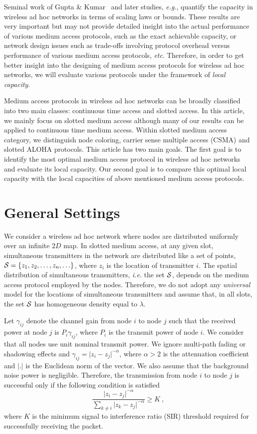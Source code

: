 \documentclass[12pt,english]{article}
\begin{document}
Seminal work of Gupta \& Kumar~\cite{Gupta:Kumar} and later studies, {\it e.g.}, \cite{scaling,scaling2} quantify the capacity in wireless ad hoc networks in terms of scaling laws or bounds. These results are very important but may not provide detailed insight into the actual performance of various medium access protocols, such as the exact achievable capacity, or network design issues such as trade-offs involving protocol overhead versus performance of various medium access protocols, {\it etc}. Therefore, in order to get better insight into the designing of medium access protocols for wireless ad hoc networks, we will evaluate various protocols under the framework of {\em local capacity}.

Medium access protocols in wireless ad hoc networks can be broadly classified into two main classes: continuous time access and slotted access. In this article, we mainly focus on slotted medium access although many of our results can be applied to continuous time medium access. Within slotted medium access category, we distinguish node coloring, carrier sense multiple access (CSMA) and slotted ALOHA protocols. This article has two main goals. The first goal is to identify the most optimal medium access protocol in wireless ad hoc networks and evaluate its local capacity. Our second goal is to compare this optimal local capacity with the local capacities of above mentioned medium access protocols.

\section{General Settings}
\label{sec:model}

We consider a wireless ad hoc network where nodes are distributed uniformly over an infinite $2D$ map. In slotted medium access, at any given slot, simultaneous transmitters in the network are distributed like a set of points, \mbox{${\cal S}=\{z_1,z_2,\ldots,z_n,\ldots\}$}, where $z_i$ is the location of transmitter $i$. The spatial distribution of simultaneous transmitters, {\it i.e.} the set ${\cal S}$, depends on the medium access protocol employed by the nodes. Therefore, we do not adopt any {\em universal} model for the locations of simultaneous transmitters and assume that, in all slots, the set ${\cal S}$ has homogeneous density equal to $\lambda$. 

Let $\gamma_{ij}$ denote the channel gain from node $i$ to node $j$ such that the received power at node $j$ is $P_i\gamma_{ij}$, where $P_i$ is the transmit power of node $i$. We consider that all nodes use unit nominal transmit power. We ignore multi-path fading or shadowing effects and \mbox{$\gamma_{ij}=\vert z_i-z_j\vert^{-\alpha}$}, where \mbox{$\alpha>2$} is the attenuation coefficient and $\vert .\vert$ is the Euclidean norm of the vector. We also assume that the background noise power is negligible. Therefore, the transmission from node $i$ to node $j$ is successful only if the following condition is satisfied
$$
\frac{\vert  z_i-z_j\vert^{-\alpha}}{\sum_{k\neq i}\vert  z_k-z_j\vert^{-\alpha}}\geq K~,
$$
where $K$ is the minimum signal to interference ratio (SIR) threshold required for successfully receiving the packet. 
\end{document}
